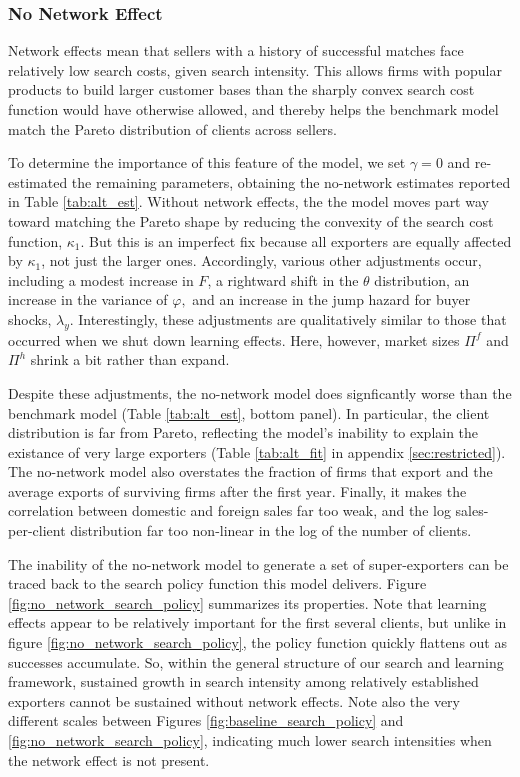 \subsubsection{No Network Effect}

Network effects mean that sellers with a history of successful matches face
relatively low search costs, given search intensity. This allows firms with
popular products to build larger customer bases than the sharply convex
search cost function would have otherwise allowed, and thereby helps the
benchmark model match the Pareto distribution of clients across sellers.

To determine the importance of this feature of the model, we set $\gamma =0$
and re-estimated the remaining parameters, obtaining the no-network
estimates reported in Table \ref{tab:alt_est}. Without network effects, the the model moves part way toward matching the
Pareto shape by reducing the convexity of the search cost function, $\kappa
_{1}.$ But this is an imperfect fix because all exporters are equally
affected by $\kappa _{1}$, not just the larger ones. Accordingly, various
other adjustments occur, including a modest increase in $F$, a rightward
shift in the $\theta $ distribution, an increase in the variance of $\varphi
,$ and an increase in the jump hazard for buyer shocks, $\lambda _{y}.$
Interestingly, these adjustments are qualitatively similar to those that
occurred when we shut down learning effects. Here, however, market sizes $%
\Pi ^{f}$ and $\Pi ^{h}$ shrink a bit rather than expand.

Despite these adjustments, the no-network model does signficantly worse than
the benchmark model (Table \ref{tab:alt_est}, bottom panel). In particular,
the client distribution is far from Pareto, reflecting the model's inability
to explain the existance of very large exporters (Table \ref{tab:alt_fit} in
appendix \ref{sec:restricted}). The no-network model also overstates the
fraction of firms that export and the average exports of surviving firms
after the first year. Finally, it makes the correlation between domestic and
foreign sales far too weak, and the log sales-per-client distribution far
too non-linear in the log of the number of clients.

The inability of the no-network model to generate a set of super-exporters
can be traced back to the search policy function this model delivers. Figure %
\ref{fig:no_network_search_policy} summarizes its properties. Note that
learning effects appear to be relatively important for the first several
clients, but unlike in figure \ref{fig:no_network_search_policy}, the policy
function quickly flattens out as successes accumulate. So, within the
general structure of our search and learning framework, sustained growth in
search intensity among relatively established exporters cannot be sustained
without network effects. Note also the very different scales between Figures %
\ref{fig:baseline_search_policy} and \ref{fig:no_network_search_policy},
indicating much lower search intensities when the network effect is not
present.

